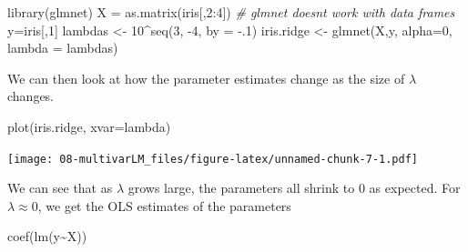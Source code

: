 \documentclass[
]{book}
\newenvironment{Shaded}{\begin{snugshade}}{\end{snugshade}}
\newcommand{\AttributeTok}[1]{\textcolor[rgb]{0.77,0.63,0.00}{#1}}
\newcommand{\CommentTok}[1]{\textcolor[rgb]{0.56,0.35,0.01}{\textit{#1}}}
\newcommand{\DecValTok}[1]{\textcolor[rgb]{0.00,0.00,0.81}{#1}}
\newcommand{\FunctionTok}[1]{\textcolor[rgb]{0.00,0.00,0.00}{#1}}
\newcommand{\NormalTok}[1]{#1}
\newcommand{\OtherTok}[1]{\textcolor[rgb]{0.56,0.35,0.01}{#1}}
\newcommand{\SpecialCharTok}[1]{\textcolor[rgb]{0.00,0.00,0.00}{#1}}
\newcommand{\StringTok}[1]{\textcolor[rgb]{0.31,0.60,0.02}{#1}}
\theoremstyle{definition}
\theoremstyle{definition}
\theoremstyle{definition}
\theoremstyle{definition}
\theoremstyle{remark}
\begin{document}
\begin{Shaded}
\begin{Highlighting}[]
\FunctionTok{library}\NormalTok{(glmnet)}
\NormalTok{X }\OtherTok{=} \FunctionTok{as.matrix}\NormalTok{(iris[,}\DecValTok{2}\SpecialCharTok{:}\DecValTok{4}\NormalTok{]) }\CommentTok{\# glmnet doesn\textquotesingle{}t work with data frames}
\NormalTok{y}\OtherTok{=}\NormalTok{iris[,}\DecValTok{1}\NormalTok{]}
\NormalTok{lambdas }\OtherTok{\textless{}{-}} \DecValTok{10}\SpecialCharTok{\^{}}\FunctionTok{seq}\NormalTok{(}\DecValTok{3}\NormalTok{, }\SpecialCharTok{{-}}\DecValTok{4}\NormalTok{, }\AttributeTok{by =} \SpecialCharTok{{-}}\NormalTok{.}\DecValTok{1}\NormalTok{)}
\NormalTok{iris.ridge }\OtherTok{\textless{}{-}} \FunctionTok{glmnet}\NormalTok{(X,y, }\AttributeTok{alpha=}\DecValTok{0}\NormalTok{, }\AttributeTok{lambda =}\NormalTok{ lambdas)}
\end{Highlighting}
\end{Shaded}

We can then look at how the parameter estimates change as the size of \(\lambda\) changes.

\begin{Shaded}
\begin{Highlighting}[]
\FunctionTok{plot}\NormalTok{(iris.ridge, }\AttributeTok{xvar=}\StringTok{\textquotesingle{}lambda\textquotesingle{}}\NormalTok{) }
\end{Highlighting}
\end{Shaded}

\texttt{[image: 08-multivarLM\_files/figure-latex/unnamed-chunk-7-1.pdf]}

\begin{Shaded}
\end{Shaded}

We can see that as \(\lambda\) grows large, the parameters all shrink to \(0\) as expected. For \(\lambda\approx 0\), we get the OLS estimates of the parameters

\begin{Shaded}
\begin{Highlighting}[]
\FunctionTok{coef}\NormalTok{(}\FunctionTok{lm}\NormalTok{(y}\SpecialCharTok{\textasciitilde{}}\NormalTok{X))}
\end{Highlighting}
\end{Shaded}
\end{document}
